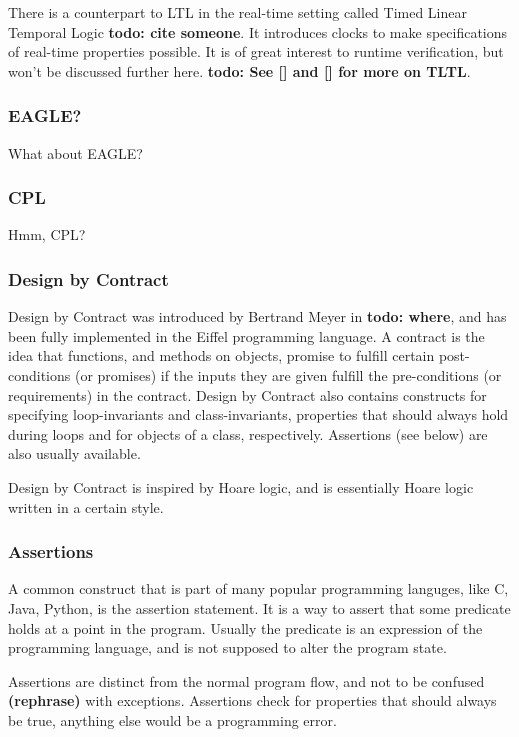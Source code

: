 \documentclass[a4paper,11pt]{kth-mag}
\newcommand{\todo}[1]{\textbf{todo: #1}}
\newcommand{\rephrase}{\textbf{(rephrase)} }
\begin{document}
There is a counterpart to LTL in the real-time setting called Timed Linear
Temporal Logic \todo{cite someone}. It introduces clocks to make specifications
of real-time properties possible. It is of great interest to runtime
verification, but won't be discussed further here. \todo{See [] and [] for more
on TLTL}.

\subsubsection{EAGLE?}

What about EAGLE?

\subsubsection{CPL}

Hmm, CPL?


\subsubsection{Design by Contract}

Design by Contract was introduced by Bertrand Meyer in \todo{where}, and has
been fully implemented in the Eiffel programming language. A contract is the
idea that functions, and methods on objects, promise to fulfill certain
post-conditions (or promises) if the inputs they are given fulfill the
pre-conditions (or requirements) in the contract. Design by Contract also
contains constructs for specifying loop-invariants and class-invariants,
properties that should always hold during loops and for objects of a class,
respectively. Assertions (see below) are also usually available.

Design by Contract is inspired by Hoare logic, and is essentially Hoare logic
written in a certain style.


\subsubsection{Assertions}

A common construct that is part of many popular programming languges, like C,
Java, Python, is the assertion statement. It is a way to assert that some
predicate holds at a point in the program. Usually the predicate is an
expression of the programming language, and is not supposed to alter the
program state.

Assertions are distinct from the normal program flow, and not to be confused
\rephrase with exceptions. Assertions check for properties that should always
be true, anything else would be a programming error.
\end{document}
